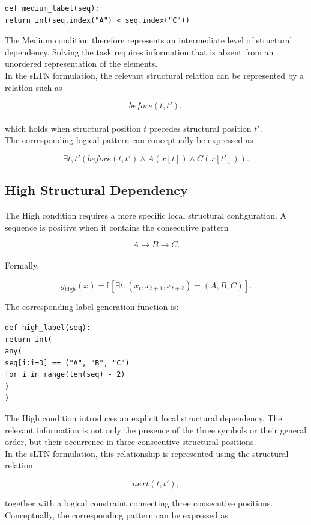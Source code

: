 \begin{verbatim}
def medium_label(seq):
return int(seq.index("A") < seq.index("C"))
\end{verbatim}

\noindent
The Medium condition therefore represents an intermediate level of structural dependency. Solving the task requires information that is absent from an unordered representation of the elements.
\\
In the sLTN formulation, the relevant structural relation can be represented by a relation such as

$$
before(t,t'),
$$
\\
which holds when structural position $t$ precedes structural position $t'$.
\\
The corresponding logical pattern can conceptually be expressed as

$$
\exists t,t'
\left(
before(t,t')
\land
A(x[t])
\land
C(x[t'])
\right).
$$

\subsection{High Structural Dependency}

\noindent
The High condition requires a more specific local structural configuration. A sequence is positive when it contains the consecutive pattern

$$
A \rightarrow B \rightarrow C.
$$
\\
Formally,

$$
y_{\mathrm{high}}(x)
=
\mathbb{I}
\left[
\exists t:
(x_t,x_{t+1},x_{t+2})=(A,B,C)
\right].
$$

\noindent
The corresponding label-generation function is:

\begin{verbatim}
def high_label(seq):
return int(
any(
seq[i:i+3] == ("A", "B", "C")
for i in range(len(seq) - 2)
)
)
\end{verbatim}

\noindent
The High condition introduces an explicit local structural dependency. The relevant information is not only the presence of the three symbols or their general order, but their occurrence in three consecutive structural positions.
\\
In the sLTN formulation, this relationship is represented using the structural relation

$$
next(t,t'),
$$

together with a logical constraint connecting three consecutive positions. Conceptually, the corresponding pattern can be expressed as

